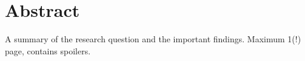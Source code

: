 \chapter*{Abstract}

A summary of the research question and the important findings.
Maximum 1(!) page, contains spoilers.

\lipsum[4]
